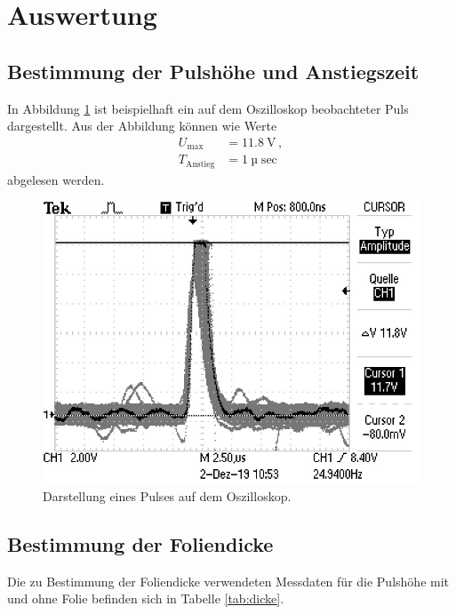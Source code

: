 \section{Auswertung}
\label{sec:Auswertung}

\subsection{Bestimmung der Pulshöhe und Anstiegszeit}
\label{subsec:puls}

In Abbildung \ref{fig:puls} ist beispielhaft ein auf dem Oszilloskop beobachteter Puls
dargestellt. Aus der Abbildung können wie Werte
\begin{align*}
  U_\text{max}&= \SI{11.8}{\volt}\,,\\
  T_\text{Anstieg}&= \SI{1}{µ\sec}
\end{align*}
abgelesen werden.

\begin{figure}
  \centering
  \includegraphics[width=\textwidth]{images/peak.JPG}
  \caption{Darstellung eines Pulses auf dem Oszilloskop.}
  \label{fig:puls}
\end{figure}

\subsection{Bestimmung der Foliendicke}
\label{subsec:dicke}

Die zu Bestimmung der Foliendicke verwendeten Messdaten für die Pulshöhe
mit und ohne Folie befinden sich in Tabelle \ref{tab:dicke}.

